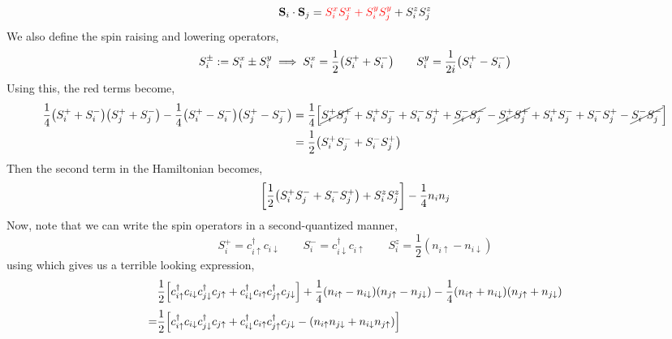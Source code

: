 \documentclass{article}
\newcommand{\spi}[2]{S_{#1}^{#2}}
\begin{document}
\begin{align}
    \vb{S}_{i}\cdot \vb{S}_j =\mathcolor{red}{ \spi{i}{x}\spi{j}{x}+\spi{i}{y}\spi{j}{y}}+\spi{i}{z}\spi{j}{z}
\end{align}
We also define the spin raising and lowering operators, 
\begin{align}
    \spi{i}{\pm}:= \spi{i}{x}\pm \spi{i}{y} \implies \spi{i}{x}= \frac{1}{2}\qty(\spi{i}{+} + \spi{i}{-}) \qquad  \spi{i}{y}= \frac{1}{2i}\qty(\spi{i}{+} - \spi{i}{-})
\end{align}
Using this, the red terms become, 
\begin{align}
   \begin{split}
     \frac{1}{4}\qty(\spi{i}{+}+\spi{i}{-})\qty(\spi{j}{+}+\spi{j}{-})- \frac{1}{4}\qty(\spi{i}{+}-\spi{i}{-})\qty(\spi{j}{+}-\spi{j}{-}) &= \frac{1}{4}\qty[\cancel{\spi{i}{+}\spi{j}{+}}+\spi{i}{+}\spi{j}{-}+\spi{i}{-}\spi{j}{+}+\cancel{\spi{i}{-}\spi{j}{-}} - \cancel{\spi{i}{+}\spi{j}{+}} +\spi{i}{+}\spi{j}{-}+\spi{i}{-}\spi{j}{+} -\cancel{\spi{i}{-}\spi{j}{-}}]\\
    &=\frac{1}{2}\qty(\spi{i}{+}\spi{j}{-}+\spi{i}{-}\spi{j}{+})
   \end{split}
\end{align}
Then the second term in the Hamiltonian becomes, 
\begin{equation}
    \qty[\frac{1}{2}\qty(\spi{i}{+}\spi{j}{-}+\spi{i}{-}\spi{j}{+}) +\spi{i}{z}\spi{j}{z}]  - \frac{1}{4}n_in_j
\end{equation}
Now, note that we can write the spin operators in a second-quantized manner, 
\begin{equation}
    \spi{i}{+} = c_{i\uparrow}^{\dagger}c_{i\downarrow}\qquad \spi{i}{-} = c_{i\downarrow}^{\dagger}c_{i\uparrow}\qquad \spi{i}{z} = \frac{1}{2}(n_{i\uparrow}-n_{i\downarrow})
\end{equation}
using which gives us a terrible looking expression,
\begin{align}
    &\frac{1}{2}\qty[c_{i\uparrow}^{\dagger}c_{i\downarrow}c_{j\downarrow}^{\dagger}c_{j\uparrow}  +c_{i\downarrow}^{\dagger}c_{i\uparrow} c_{j\uparrow}^{\dagger}c_{j\downarrow}] + \frac{1}{4}\qty(n_{i\uparrow}-n_{i\downarrow})\qty(n_{j\uparrow}-n_{j\downarrow}) -\frac{1}{4}\qty(n_{i\uparrow}+n_{i\downarrow})\qty(n_{j\uparrow}+n_{j\downarrow})\\[0.1cm]
    =&\frac{1}{2}\qty[c_{i\uparrow}^{\dagger}c_{i\downarrow}c_{j\downarrow}^{\dagger}c_{j\uparrow}  +c_{i\downarrow}^{\dagger}c_{i\uparrow} c_{j\uparrow}^{\dagger}c_{j\downarrow} - \qty(n_{i\uparrow}n_{j\downarrow} + n_{i\downarrow}n_{j\uparrow})]
\end{align}
\end{document}
